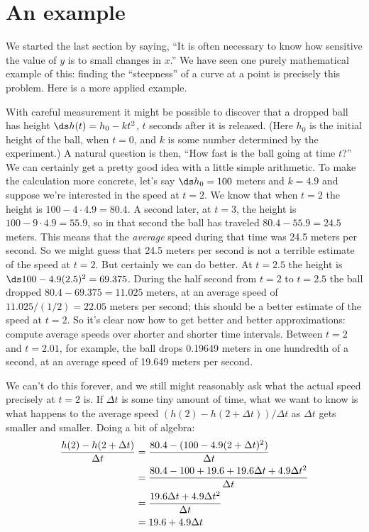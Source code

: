\section{An example}{}{}

We started the last section by saying, ``It is often necessary to know
how sensitive the value of $y$ is to small changes in $x$.'' We have
seen one purely mathematical example of this: finding the
``steepness'' of a curve at a point is precisely this problem. Here is
a more applied example.

With careful measurement it might be possible to discover that a
dropped ball has height $\ds h(t)=h_0-kt^2$, $t$ seconds after it is
released. (Here $h_0$ is the initial height of the ball, when $t=0$,
and $k$ is some number determined by the experiment.)  A natural
question is then, ``How fast is the ball going at time $t$?'' We can
certainly get a pretty good idea with a little simple arithmetic. To
make the calculation more concrete, let's say $\ds h_0=100$ meters and $k=4.9$
and suppose we're interested in the speed at $t=2$. We know that when
$t=2$ the height is $100-4\cdot 4.9=80.4$. A second later, at $t=3$,
the height is $100-9\cdot 4.9=55.9$, so in that second the ball has
traveled $80.4-55.9=24.5$ meters. This means that the {\it average\/}
speed during that time was 24.5 meters per second. So we might guess
that 24.5 meters per second is not a terrible estimate of the speed at
$t=2$. But certainly we can do better. At $t=2.5$ the height is
$\ds 100-4.9(2.5)^2=69.375$. During the half second from $t=2$ to $t=2.5$ the
ball dropped $80.4-69.375=11.025$ meters, at an average speed of 
$11.025/(1/2)=22.05$ meters per second; this should be a better estimate
of the speed at $t=2$. So it's clear now how to get better and better
approximations: compute average speeds over shorter and shorter time
intervals. Between $t=2$ and $t=2.01$, for example, the ball drops
0.19649 meters in one hundredth of a second, at an average speed of
19.649 meters per second.

We can't do this forever, and we still might reasonably ask what the
actual speed precisely at $t=2$ is. If $\Delta t$ is some tiny amount
of time, what we want to know is what happens to the average speed
$(h(2)-h(2+\Delta t))/\Delta t$ as $\Delta t$ gets smaller and
smaller. Doing a bit of algebra:
\begin{align*}
{h(2)-h(2+\Delta t)\over \Delta t}&={80.4-(100-4.9(2+\Delta
    t)^2)\over \Delta t} \\
&={80.4 - 100 + 19.6+19.6\Delta t+4.9\Delta t^2\over \Delta t} \\
&={19.6\Delta t+4.9\Delta t^2\over \Delta t} \\
&=19.6 + 4.9\Delta t \\
\end{align*}

